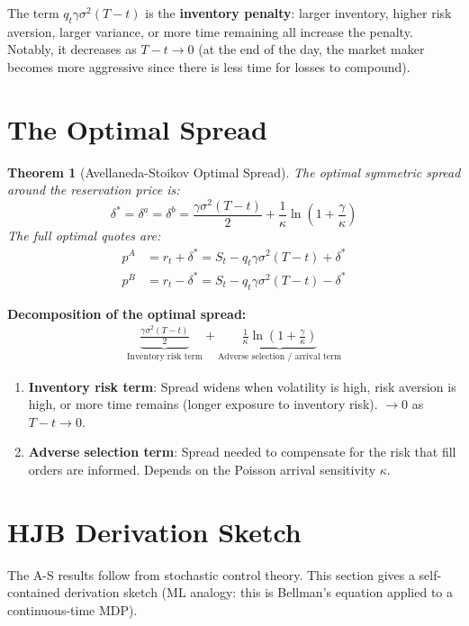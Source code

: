 \documentclass[12pt,a4paper,openany]{report}
\newtheorem{theorem}{Theorem}[chapter]
\theoremstyle{definition}
\begin{document}
The term $q_t\gamma\sigma^2(T-t)$ is the \textbf{inventory penalty}: larger inventory, higher risk aversion, larger variance, or more time remaining all increase the penalty. Notably, it decreases as $T-t \to 0$ (at the end of the day, the market maker becomes more aggressive since there is less time for losses to compound).

\section{The Optimal Spread}

\begin{theorem}[Avellaneda-Stoikov Optimal Spread]
The optimal symmetric spread around the reservation price is:
\[
  \delta^* = \delta^a = \delta^b = \frac{\gamma\sigma^2(T-t)}{2} + \frac{1}{\kappa}\ln\!\left(1 + \frac{\gamma}{\kappa}\right)
\]
The full optimal quotes are:
\begin{align}
  p^A &= r_t + \delta^* = S_t - q_t\gamma\sigma^2(T-t) + \delta^* \\
  p^B &= r_t - \delta^* = S_t - q_t\gamma\sigma^2(T-t) - \delta^*
\end{align}
\end{theorem}

\textbf{Decomposition of the optimal spread:}
\begin{align}
  \underbrace{\frac{\gamma\sigma^2(T-t)}{2}}_{\text{Inventory risk term}} + \underbrace{\frac{1}{\kappa}\ln\!\left(1 + \frac{\gamma}{\kappa}\right)}_{\text{Adverse selection / arrival term}}
\end{align}

\begin{enumerate}[label=\arabic*.]
  \item \textbf{Inventory risk term}: Spread widens when volatility is high, risk aversion is high, or more time remains (longer exposure to inventory risk). $\to 0$ as $T-t \to 0$.
  \item \textbf{Adverse selection term}: Spread needed to compensate for the risk that fill orders are informed. Depends on the Poisson arrival sensitivity $\kappa$.
\end{enumerate}

\section{HJB Derivation Sketch}
\label{sec:as-hjb}

The A-S results follow from stochastic control theory. This section gives a self-contained derivation sketch (ML analogy: this is Bellman's equation applied to a continuous-time MDP).
\end{document}
